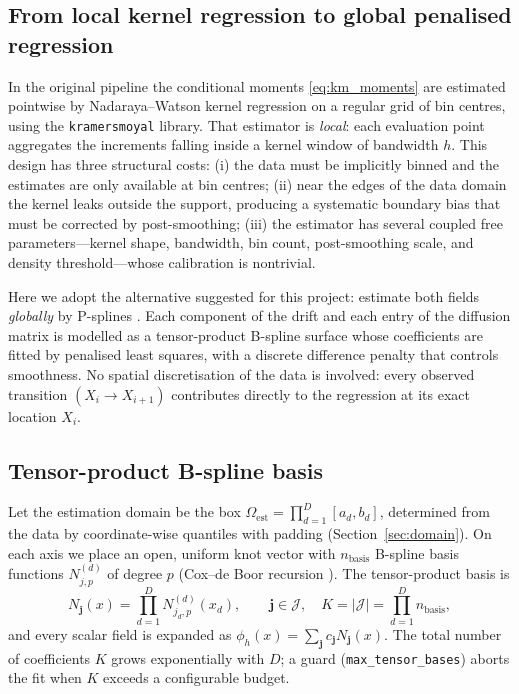 \documentclass[11pt,a4paper]{article}
\begin{document}
\subsection{From local kernel regression to global penalised regression}

In the original pipeline the conditional moments \eqref{eq:km_moments} are
estimated pointwise by Nadaraya--Watson kernel regression
\cite{wand1995,rydin2019} on a regular grid of bin centres, using the
\texttt{kramersmoyal} library. That estimator is \emph{local}: each evaluation
point aggregates the increments falling inside a kernel window of bandwidth
$h$. This design has three structural costs: (i) the data must be implicitly
binned and the estimates are only available at bin centres; (ii) near the edges
of the data domain the kernel leaks outside the support, producing a systematic
boundary bias that must be corrected by post-smoothing; (iii) the estimator has
several coupled free parameters---kernel shape, bandwidth, bin count,
post-smoothing scale, and density threshold---whose calibration is nontrivial.

Here we adopt the alternative suggested for this project: estimate both fields
\emph{globally} by P-splines \cite{eilers1996}. Each component of the drift and
each entry of the diffusion matrix is modelled as a tensor-product B-spline
surface whose coefficients are fitted by penalised least squares, with a
discrete difference penalty that controls smoothness. No spatial
discretisation of the data is involved: every observed transition
$(X_i \to X_{i+1})$ contributes directly to the regression at its exact
location $X_i$.

\subsection{Tensor-product B-spline basis}

Let the estimation domain be the box
$\Omega_{\mathrm{est}} = \prod_{d=1}^{D} [a_d, b_d]$, determined from the data
by coordinate-wise quantiles with padding (Section~\ref{sec:domain}). On each
axis we place an open, uniform knot vector with $n_{\text{basis}}$ B-spline
basis functions $N^{(d)}_{j,p}$ of degree $p$ (Cox--de Boor recursion
\cite{piegl2012}). The tensor-product basis is
\begin{equation}
N_{\mathbf{j}}(x) = \prod_{d=1}^{D} N^{(d)}_{j_d, p}(x_d),
\qquad
\mathbf{j} \in \mathcal{J},\quad K = |\mathcal{J}| = \prod_{d=1}^{D} n_{\text{basis}} ,
\label{eq:tensor_basis}
\end{equation}
and every scalar field is expanded as $\phi_h(x) = \sum_{\mathbf{j}}
c_{\mathbf{j}} N_{\mathbf{j}}(x)$. The total number of coefficients $K$ grows
exponentially with $D$; a guard (\texttt{max\_tensor\_bases}) aborts the fit
when $K$ exceeds a configurable budget.
\end{document}

